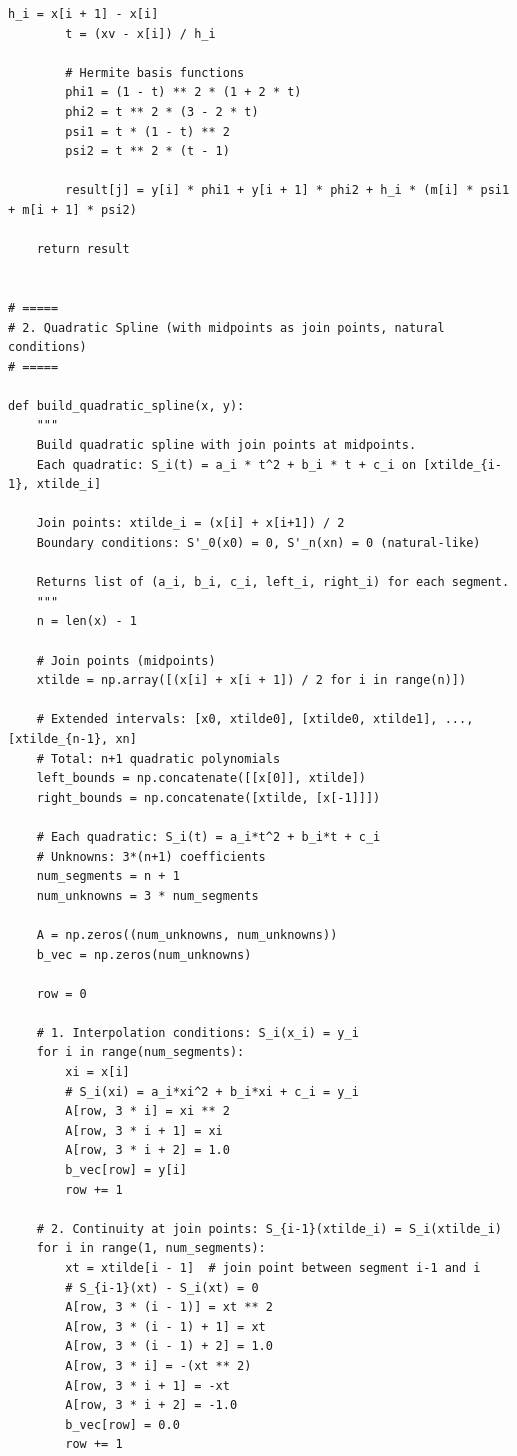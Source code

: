\documentclass[14pt,a4paper]{extarticle}
\begin{document}
\begin{lstlisting}[caption={Файл lab3.py}, label={lst:lab3code}]
        h_i = x[i + 1] - x[i]
        t = (xv - x[i]) / h_i

        # Hermite basis functions
        phi1 = (1 - t) ** 2 * (1 + 2 * t)
        phi2 = t ** 2 * (3 - 2 * t)
        psi1 = t * (1 - t) ** 2
        psi2 = t ** 2 * (t - 1)

        result[j] = y[i] * phi1 + y[i + 1] * phi2 + h_i * (m[i] * psi1 + m[i + 1] * psi2)

    return result


# =====
# 2. Quadratic Spline (with midpoints as join points, natural conditions)
# =====

def build_quadratic_spline(x, y):
    """
    Build quadratic spline with join points at midpoints.
    Each quadratic: S_i(t) = a_i * t^2 + b_i * t + c_i on [xtilde_{i-1}, xtilde_i]
    
    Join points: xtilde_i = (x[i] + x[i+1]) / 2
    Boundary conditions: S'_0(x0) = 0, S'_n(xn) = 0 (natural-like)
    
    Returns list of (a_i, b_i, c_i, left_i, right_i) for each segment.
    """
    n = len(x) - 1
    
    # Join points (midpoints)
    xtilde = np.array([(x[i] + x[i + 1]) / 2 for i in range(n)])
    
    # Extended intervals: [x0, xtilde0], [xtilde0, xtilde1], ..., [xtilde_{n-1}, xn]
    # Total: n+1 quadratic polynomials
    left_bounds = np.concatenate([[x[0]], xtilde])
    right_bounds = np.concatenate([xtilde, [x[-1]]])
    
    # Each quadratic: S_i(t) = a_i*t^2 + b_i*t + c_i
    # Unknowns: 3*(n+1) coefficients
    num_segments = n + 1
    num_unknowns = 3 * num_segments
    
    A = np.zeros((num_unknowns, num_unknowns))
    b_vec = np.zeros(num_unknowns)
    
    row = 0
    
    # 1. Interpolation conditions: S_i(x_i) = y_i
    for i in range(num_segments):
        xi = x[i]
        # S_i(xi) = a_i*xi^2 + b_i*xi + c_i = y_i
        A[row, 3 * i] = xi ** 2
        A[row, 3 * i + 1] = xi
        A[row, 3 * i + 2] = 1.0
        b_vec[row] = y[i]
        row += 1
    
    # 2. Continuity at join points: S_{i-1}(xtilde_i) = S_i(xtilde_i)
    for i in range(1, num_segments):
        xt = xtilde[i - 1]  # join point between segment i-1 and i
        # S_{i-1}(xt) - S_i(xt) = 0
        A[row, 3 * (i - 1)] = xt ** 2
        A[row, 3 * (i - 1) + 1] = xt
        A[row, 3 * (i - 1) + 2] = 1.0
        A[row, 3 * i] = -(xt ** 2)
        A[row, 3 * i + 1] = -xt
        A[row, 3 * i + 2] = -1.0
        b_vec[row] = 0.0
        row += 1
    

\end{lstlisting}
\end{document}
